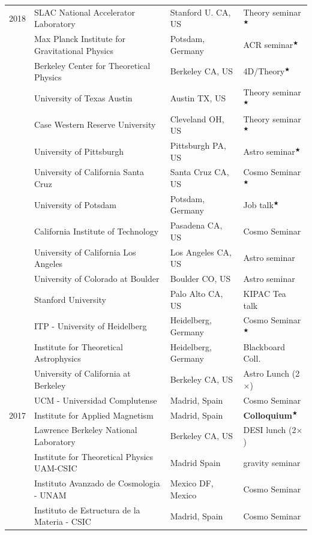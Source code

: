\documentclass[11pt,a4paper]{article}
\begin{document}
\begin{longtable}{l p{} p{3.5cm} p{3cm}}
\\[2pt] 2018  
& SLAC National Accelerator Laboratory & Stanford U. CA, US & Theory seminar$^\bigstar$ \\ 
  & Max Planck Institute for Gravitational Physics 
  & Potsdam, Germany & ACR seminar$^\bigstar$ \\ 
& Berkeley Center for Theoretical Physics & Berkeley CA, US & 4D/Theory$^\bigstar$ \\
& University of Texas Austin & Austin TX, US & Theory seminar$^\bigstar$ \\
& Case Western Reserve University & Cleveland OH, US & Theory seminar$^\bigstar$ \\ %
& University of Pittsburgh & Pittsburgh PA, US & Astro seminar$^\bigstar$ \\
  & University of California Santa Cruz & Santa Cruz CA, US & Cosmo Seminar$^\bigstar$ \\
   & University of Potsdam & Potsdam, Germany & Job talk$^\bigstar$ \\
  & {California Institute of Technology} & Pasadena CA, US & Cosmo Seminar \\ 
 & University of California Los Angeles & Los Angeles CA, US & Astro seminar \\
      & {University of Colorado at Boulder} & Boulder CO, US & Astro seminar \\ 
      & {Stanford University} & Palo Alto CA, US & KIPAC Tea talk \\ 
      & {ITP - University of Heidelberg} & Heidelberg, Germany & Cosmo Seminar$^\bigstar$ \\
   & {Institute for Theoretical Astrophysics} & Heidelberg, Germany & Blackboard Coll. \\
      & {University of California at Berkeley} & Berkeley CA, US & Astro Lunch (2$\times$) \\ 
    & {UCM - Universidad Complutense} & Madrid, Spain & Cosmo Seminar 
\\[2pt] 2017 &
{Institute for Applied Magnetism} & Madrid, Spain & \textbf{Colloquium}$^\bigstar$ \\
& Lawrence Berkeley National Laboratory & Berkeley CA, US & DESI lunch (2$\times$) \\
    & {Institute for Theoretical Physics UAM-CSIC} & Madrid Spain & gravity seminar \\
    & Instituto Avanzado de Cosmologia - {UNAM} & Mexico DF, Mexico & Cosmo Seminar \\
      & {Instituto de Estructura de la Materia - CSIC} & Madrid, Spain & Cosmo Seminar 

\end{longtable}
\end{document}
